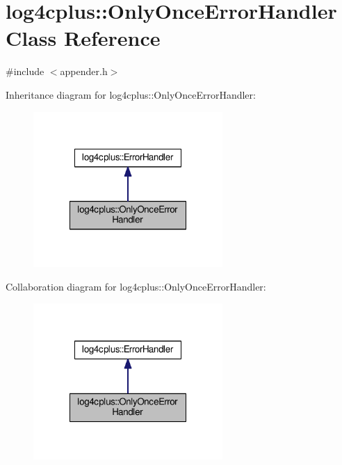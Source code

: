 \hypertarget{classlog4cplus_1_1OnlyOnceErrorHandler}{\section{log4cplus\-:\-:Only\-Once\-Error\-Handler Class Reference}
\label{classlog4cplus_1_1OnlyOnceErrorHandler}
}


{\ttfamily \#include $<$appender.\-h$>$}



Inheritance diagram for log4cplus\-:\-:Only\-Once\-Error\-Handler\-:
\nopagebreak
\begin{figure}[H]
\begin{center}
\leavevmode
\includegraphics[width=204pt]{classlog4cplus_1_1OnlyOnceErrorHandler__inherit__graph}
\end{center}
\end{figure}


Collaboration diagram for log4cplus\-:\-:Only\-Once\-Error\-Handler\-:
\nopagebreak
\begin{figure}[H]
\begin{center}
\leavevmode
\includegraphics[width=204pt]{classlog4cplus_1_1OnlyOnceErrorHandler__coll__graph}
\end{center}
\end{figure}
